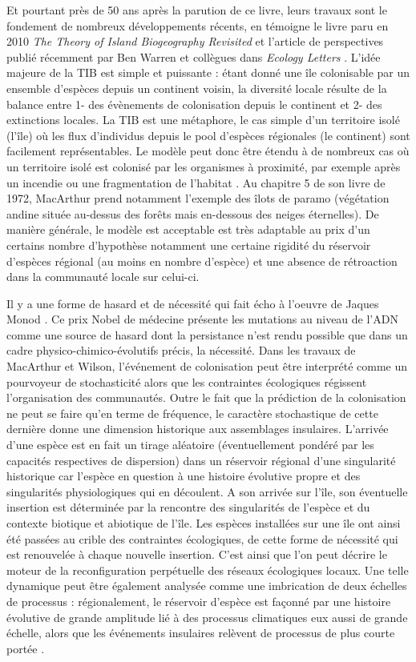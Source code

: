 Et pourtant près de 50 ans après la parution de ce livre, leurs travaux
sont le fondement de nombreux développements récents, en témoigne le
livre paru en 2010 \emph{The Theory of Island Biogeography Revisited}
\citep{Losos2010} et l'article de perspectives publié récemment par Ben
Warren et collègues dans \emph{Ecology Letters} \citep{Warren2015}.
L'idée majeure de la TIB est simple et puissante : étant donné une île
colonisable par un ensemble d'espèces depuis un continent voisin, la
diversité locale résulte de la balance entre 1- des évènements de
colonisation depuis le continent et 2- des extinctions locales. La TIB
est une métaphore, le cas simple d'un territoire isolé (l'île) où les
flux d'individus depuis le pool d'espèces régionales (le continent) sont
facilement représentables. Le modèle peut donc être étendu à de nombreux
cas où un territoire isolé est colonisé par les organismes à proximité,
par exemple après un incendie ou une fragmentation de l'habitat
\citep{Cook2002}. Au chapitre 5 de son livre de 1972, MacArthur prend
notamment l'exemple des îlots de paramo (végétation andine située
au-dessus des forêts mais en-dessous des neiges éternelles). De manière
générale, le modèle est acceptable est très adaptable au prix d'un
certains nombre d'hypothèse notamment une certaine rigidité du réservoir
d'espèces régional (au moins en nombre d'espèce) et une absence de
rétroaction dans la communauté locale sur celui-ci.

Il y a une forme de hasard et de nécessité qui fait écho à l'oeuvre de
Jaques Monod \citep{monod1970hasard}. Ce prix Nobel de médecine présente
les mutations au niveau de l'ADN comme une source de hasard dont la
persistance n'est rendu possible que dans un cadre
physico-chimico-évolutifs précis, la nécessité. Dans les travaux de
MacArthur et Wilson, l'événement de colonisation peut être interprété
comme un pourvoyeur de stochasticité alors que les contraintes
écologiques régissent l'organisation des communautés. Outre le fait que
la prédiction de la colonisation ne peut se faire qu'en terme de
fréquence, le caractère stochastique de cette dernière donne une
dimension historique aux assemblages insulaires. L'arrivée d'une espèce
est en fait un tirage aléatoire (éventuellement pondéré par les
capacités respectives de dispersion) dans un réservoir régional d'une
singularité historique car l'espèce en question à une histoire évolutive
propre et des singularités physiologiques qui en découlent. A son
arrivée sur l'île, son éventuelle insertion est déterminée par la
rencontre des singularités de l'espèce et du contexte biotique et
abiotique de l'île. Les espèces installées sur une île ont ainsi été
passées au crible des contraintes écologiques, de cette forme de
nécessité qui est renouvelée à chaque nouvelle insertion. C'est ainsi
que l'on peut décrire le moteur de la reconfiguration perpétuelle des
réseaux écologiques locaux. Une telle dynamique peut être également
analysée comme une imbrication de deux échelles de processus :
régionalement, le réservoir d'espèce est façonné par une histoire
évolutive de grande amplitude lié à des processus climatiques eux aussi
de grande échelle, alors que les événements insulaires relèvent de
processus de plus courte portée \citep{Ricklefs1987}.

